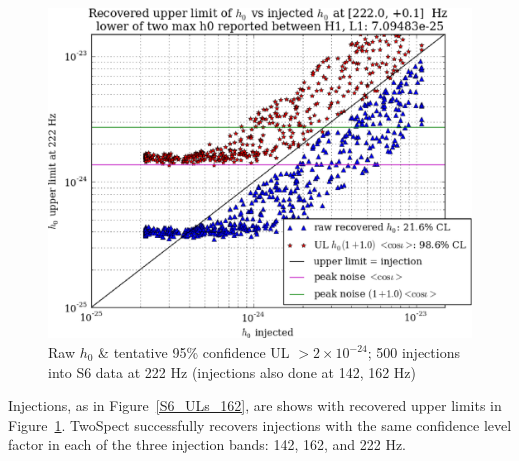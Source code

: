 \begin{figure}
\begin{center}
\includegraphics[width=0.70\paperwidth,height=0.48\paperheight]{plots/h0UL-vs-h0injected-222-0Hz.eps}
\caption{
Raw $h_0$ \& tentative 95\% confidence UL $>2\times10^{-24}$; 500 injections
into S6 data at 222 Hz (injections also done at 142, 162 Hz)}
\label{S6_ULs_222}
\end{center}
\end{figure}

Injections, as in Figure~\ref{S6_ULs_162}, are shows with recovered upper limits in Figure~\ref{S6_ULs_222}.
TwoSpect successfully recovers injections with the same confidence level factor in each of the three injection bands: 142, 162, and 222 Hz.




